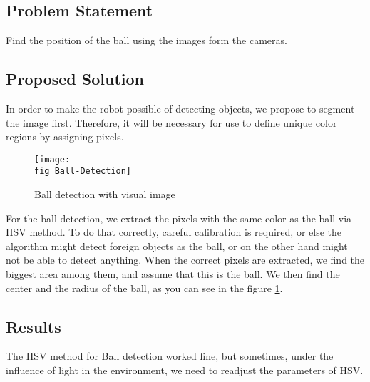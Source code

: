 \subsection*{Problem Statement}
Find the position of the ball using the images form the cameras.

\subsection*{Proposed Solution}
In order to make the robot possible of detecting objects, we propose to segment the image first. Therefore, it will be necessary for use to define unique color regions by assigning pixels.

\begin{figure}[ht]
	\texttt{[image: \\fig Ball-Detection]}
	\caption{Ball detection with visual image}
	\label{W Ball detection with visual image}

\end{figure}

For the ball detection, we extract the pixels with the same color as the
ball via HSV method. To do that correctly, careful calibration is required, or else the
algorithm might detect foreign objects as the ball, or on the other hand might not be able to detect anything. When the correct pixels are extracted, we find the biggest area among them, and assume that this is the ball. We then find the center and the radius of the ball, as you can see in the figure \ref{W Ball detection with visual image}.

\subsection*{Results}
The HSV method for Ball detection worked fine, but sometimes, under the influence of light in the environment, we need to readjust the parameters of HSV.

